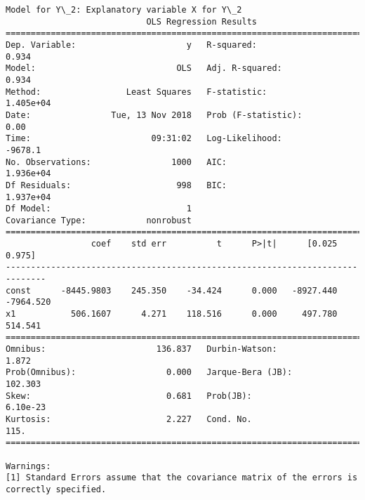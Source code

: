 \documentclass[11pt]{article}
\begin{document}
\begin{Verbatim}[commandchars=\\\{\}]
Model for Y\_2: Explanatory variable X for Y\_2
                            OLS Regression Results                            
==============================================================================
Dep. Variable:                      y   R-squared:                       0.934
Model:                            OLS   Adj. R-squared:                  0.934
Method:                 Least Squares   F-statistic:                 1.405e+04
Date:                Tue, 13 Nov 2018   Prob (F-statistic):               0.00
Time:                        09:31:02   Log-Likelihood:                -9678.1
No. Observations:                1000   AIC:                         1.936e+04
Df Residuals:                     998   BIC:                         1.937e+04
Df Model:                           1                                         
Covariance Type:            nonrobust                                         
==============================================================================
                 coef    std err          t      P>|t|      [0.025      0.975]
------------------------------------------------------------------------------
const      -8445.9803    245.350    -34.424      0.000   -8927.440   -7964.520
x1           506.1607      4.271    118.516      0.000     497.780     514.541
==============================================================================
Omnibus:                      136.837   Durbin-Watson:                   1.872
Prob(Omnibus):                  0.000   Jarque-Bera (JB):              102.303
Skew:                           0.681   Prob(JB):                     6.10e-23
Kurtosis:                       2.227   Cond. No.                         115.
==============================================================================

Warnings:
[1] Standard Errors assume that the covariance matrix of the errors is correctly specified.



\end{Verbatim}
\end{document}
